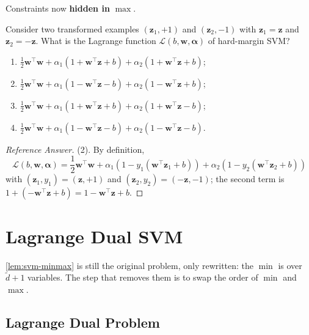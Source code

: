 \begin{moral}
    Constraints now \textbf{hidden in} \(\max\).
\end{moral}

\begin{exercise}
    Consider two transformed examples \((\bm{z}_1, +1)\) and \((\bm{z}_2,
    -1)\) with \(\bm{z}_1 = \bm{z}\) and \(\bm{z}_2 = -\bm{z}\). What is the
    Lagrange function \(\mathcal{L}(b, \bm{w}, \bm{\alpha})\) of hard-margin
    SVM?
    \begin{enumerate}[(1)]
        \item \(\frac{1}{2} \bm{w}^\top \bm{w} + \alpha_1 (1 + \bm{w}^\top
            \bm{z} + b) + \alpha_2 (1 + \bm{w}^\top \bm{z} + b)\);
        \item \(\frac{1}{2} \bm{w}^\top \bm{w} + \alpha_1 (1 - \bm{w}^\top
            \bm{z} - b) + \alpha_2 (1 - \bm{w}^\top \bm{z} + b)\);
        \item \(\frac{1}{2} \bm{w}^\top \bm{w} + \alpha_1 (1 + \bm{w}^\top
            \bm{z} + b) + \alpha_2 (1 + \bm{w}^\top \bm{z} - b)\);
        \item \(\frac{1}{2} \bm{w}^\top \bm{w} + \alpha_1 (1 - \bm{w}^\top
            \bm{z} - b) + \alpha_2 (1 - \bm{w}^\top \bm{z} - b)\).
    \end{enumerate}
\end{exercise}

\begin{proof}[Reference Answer]
    (2). By definition,
    \[
        \mathcal{L}(b, \bm{w}, \bm{\alpha}) = \frac{1}{2} \bm{w}^\top \bm{w}
        + \alpha_1 (1 - y_1 (\bm{w}^\top \bm{z}_1 + b)) + \alpha_2 (1 - y_2
        (\bm{w}^\top \bm{z}_2 + b))
    \]
    with \((\bm{z}_1, y_1) = (\bm{z}, +1)\) and \((\bm{z}_2, y_2) =
    (-\bm{z}, -1)\); the second term is \(1 + (-\bm{w}^\top \bm{z} + b) = 1
    - \bm{w}^\top \bm{z} + b\).
\end{proof}

\section{Lagrange Dual SVM}\label{sec:lagrange-dual}


\autoref{lem:svm-minmax} is still the original problem, only rewritten:
the \(\min\) is over \(\tilde{d} + 1\) variables. The step that removes them
is to swap the order of \(\min\) and \(\max\).

\subsection{Lagrange Dual Problem}

